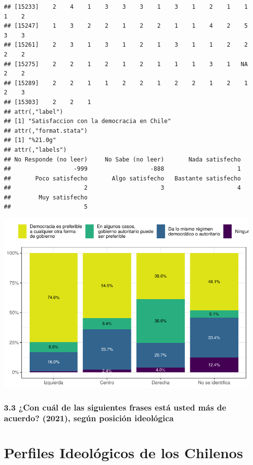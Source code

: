 \documentclass[
  12pt,
  openany]{book}
\begin{document}
\begin{verbatim}
## [15233]    2    4    1    3    3    3    1    3    1    2    1    1    1    2
## [15247]    1    3    2    2    1    2    2    1    1    4    2    5    3    3
## [15261]    2    3    1    3    1    2    1    3    1    1    2    2    2    2
## [15275]    2    2    1    2    1    2    1    1    1    3    1   NA    2    2
## [15289]    2    2    1    1    2    2    1    2    2    1    2    1    2    3
## [15303]    2    2    1
## attr(,"label")
## [1] "Satisfaccion con la democracia en Chile"
## attr(,"format.stata")
## [1] "%21.0g"
## attr(,"labels")
## No Responde (no leer)     No Sabe (no leer)       Nada satisfecho 
##                  -999                  -888                     1 
##       Poco satisfecho       Algo satisfecho   Bastante satisfecho 
##                     2                     3                     4 
##        Muy satisfecho 
##                     5
\end{verbatim}

\includegraphics{reporte-elsoc_files/figure-latex/unnamed-chunk-25-1.pdf}

\hypertarget{con-cuuxe1l-de-las-siguientes-frases-estuxe1-usted-muxe1s-de-acuerdo-2021-seguxfan-posiciuxf3n-ideoluxf3gica}{%
\subsection{3.3 ¿Con cuál de las siguientes frases está usted más de acuerdo? (2021), según posición ideológica}\label{con-cuuxe1l-de-las-siguientes-frases-estuxe1-usted-muxe1s-de-acuerdo-2021-seguxfan-posiciuxf3n-ideoluxf3gica}}

\hypertarget{perfiles-ideoluxf3gicos-de-los-chilenos}{%
\chapter{Perfiles Ideológicos de los Chilenos}\label{perfiles-ideoluxf3gicos-de-los-chilenos}}
\end{document}
